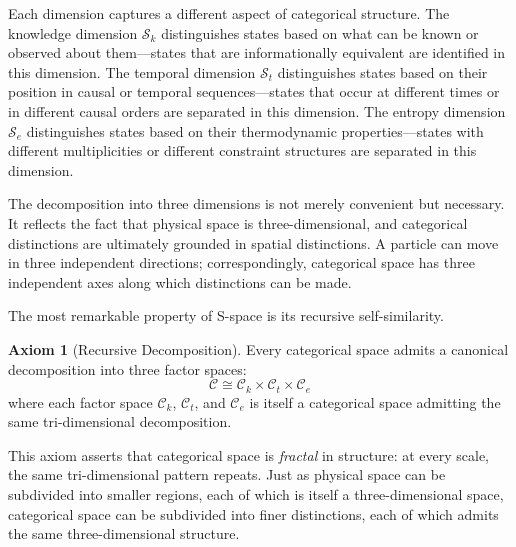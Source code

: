 \documentclass[12pt,a4paper]{article}
\theoremstyle{definition}
\newtheorem{axiom}[theorem]{Axiom}
\theoremstyle{remark}
\newcommand{\Sentropy}{\mathcal{S}}
\begin{document}
Each dimension captures a different aspect of categorical structure. The knowledge dimension $\Sentropy_k$ distinguishes states based on what can be known or observed about them—states that are informationally equivalent are identified in this dimension. The temporal dimension $\Sentropy_t$ distinguishes states based on their position in causal or temporal sequences—states that occur at different times or in different causal orders are separated in this dimension. The entropy dimension $\Sentropy_e$ distinguishes states based on their thermodynamic properties—states with different multiplicities or different constraint structures are separated in this dimension.

The decomposition into three dimensions is not merely convenient but necessary. It reflects the fact that physical space is three-dimensional, and categorical distinctions are ultimately grounded in spatial distinctions. A particle can move in three independent directions; correspondingly, categorical space has three independent axes along which distinctions can be made.

The most remarkable property of S-space is its recursive self-similarity.

\begin{axiom}[Recursive Decomposition]
\label{axiom:recursive}
Every categorical space admits a canonical decomposition into three factor spaces:
\begin{equation}
\mathcal{C} \cong \mathcal{C}_k \times \mathcal{C}_t \times \mathcal{C}_e
\end{equation}
where each factor space $\mathcal{C}_k$, $\mathcal{C}_t$, and $\mathcal{C}_e$ is itself a categorical space admitting the same tri-dimensional decomposition.
\end{axiom}

This axiom asserts that categorical space is \emph{fractal} in structure: at every scale, the same tri-dimensional pattern repeats. Just as physical space can be subdivided into smaller regions, each of which is itself a three-dimensional space, categorical space can be subdivided into finer distinctions, each of which admits the same three-dimensional structure.
\end{document}

